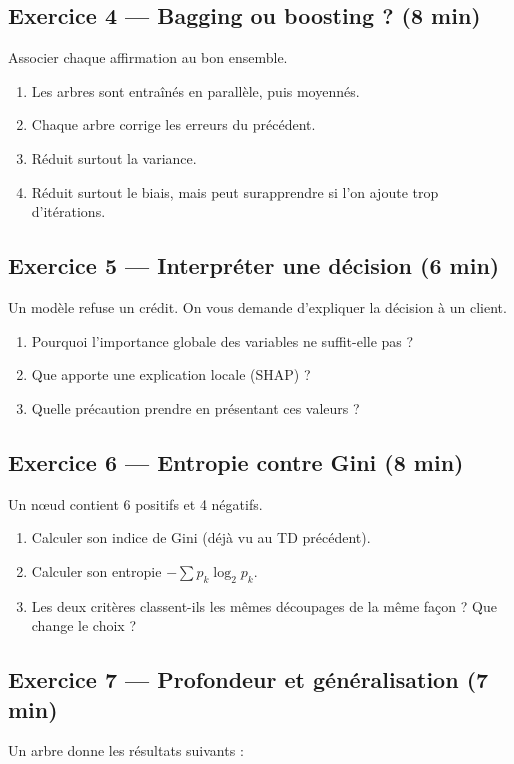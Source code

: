 \subsection*{Exercice 4 --- Bagging ou boosting ? \hfill \normalfont\footnotesize (8 min)}
Associer chaque affirmation au bon ensemble.
\begin{enumerate}
  \item Les arbres sont entraînés en parallèle, puis moyennés.
  \item Chaque arbre corrige les erreurs du précédent.
  \item Réduit surtout la variance.
  \item Réduit surtout le biais, mais peut surapprendre si l'on ajoute trop
        d'itérations.
\end{enumerate}

\subsection*{Exercice 5 --- Interpréter une décision \hfill \normalfont\footnotesize (6 min)}
Un modèle refuse un crédit. On vous demande d'expliquer la décision à un
client.
\begin{enumerate}
  \item Pourquoi l'importance globale des variables ne suffit-elle pas ?
  \item Que apporte une explication locale (SHAP) ?
  \item Quelle précaution prendre en présentant ces valeurs ?
\end{enumerate}


\subsection*{Exercice 6 --- Entropie contre Gini \hfill \normalfont\footnotesize (8 min)}
Un nœud contient 6 positifs et 4 négatifs.
\begin{enumerate}
  \item Calculer son indice de Gini (déjà vu au TD précédent).
  \item Calculer son entropie $-\sum p_k\log_2 p_k$.
  \item Les deux critères classent-ils les mêmes découpages de la même façon ?
        Que change le choix ?
\end{enumerate}

\subsection*{Exercice 7 --- Profondeur et généralisation \hfill \normalfont\footnotesize (7 min)}
Un arbre donne les résultats suivants :

